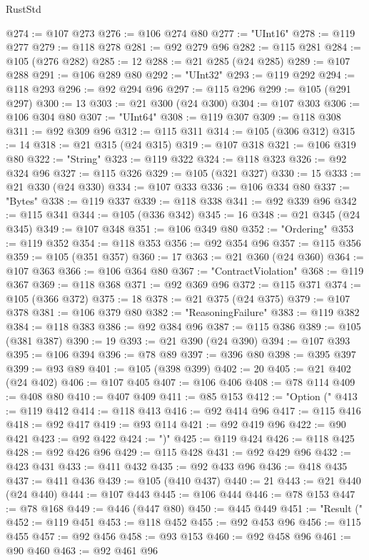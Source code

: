 \begin{lexlean}{RustStd}
\begin{coremodule}
@274 := @107 @273
@276 := @106 @274 @80
@277 := "UInt16"
@278 := @119 @277
@279 := @118 @278
@281 := @92 @279 @96
@282 := @115 @281
@284 := @105 (@276 @282)
@285 := 12
@288 := @21 @285 (@24 @285)
@289 := @107 @288
@291 := @106 @289 @80
@292 := "UInt32"
@293 := @119 @292
@294 := @118 @293
@296 := @92 @294 @96
@297 := @115 @296
@299 := @105 (@291 @297)
@300 := 13
@303 := @21 @300 (@24 @300)
@304 := @107 @303
@306 := @106 @304 @80
@307 := "UInt64"
@308 := @119 @307
@309 := @118 @308
@311 := @92 @309 @96
@312 := @115 @311
@314 := @105 (@306 @312)
@315 := 14
@318 := @21 @315 (@24 @315)
@319 := @107 @318
@321 := @106 @319 @80
@322 := "String"
@323 := @119 @322
@324 := @118 @323
@326 := @92 @324 @96
@327 := @115 @326
@329 := @105 (@321 @327)
@330 := 15
@333 := @21 @330 (@24 @330)
@334 := @107 @333
@336 := @106 @334 @80
@337 := "Bytes"
@338 := @119 @337
@339 := @118 @338
@341 := @92 @339 @96
@342 := @115 @341
@344 := @105 (@336 @342)
@345 := 16
@348 := @21 @345 (@24 @345)
@349 := @107 @348
@351 := @106 @349 @80
@352 := "Ordering"
@353 := @119 @352
@354 := @118 @353
@356 := @92 @354 @96
@357 := @115 @356
@359 := @105 (@351 @357)
@360 := 17
@363 := @21 @360 (@24 @360)
@364 := @107 @363
@366 := @106 @364 @80
@367 := "ContractViolation"
@368 := @119 @367
@369 := @118 @368
@371 := @92 @369 @96
@372 := @115 @371
@374 := @105 (@366 @372)
@375 := 18
@378 := @21 @375 (@24 @375)
@379 := @107 @378
@381 := @106 @379 @80
@382 := "ReasoningFailure"
@383 := @119 @382
@384 := @118 @383
@386 := @92 @384 @96
@387 := @115 @386
@389 := @105 (@381 @387)
@390 := 19
@393 := @21 @390 (@24 @390)
@394 := @107 @393
@395 := @106 @394
@396 := @78 @89
@397 := @396 @80
@398 := @395 @397
@399 := @93 @89
@401 := @105 (@398 @399)
@402 := 20
@405 := @21 @402 (@24 @402)
@406 := @107 @405
@407 := @106 @406
@408 := @78 @114
@409 := @408 @80
@410 := @407 @409
@411 := @85 @153
@412 := "Option ("
@413 := @119 @412
@414 := @118 @413
@416 := @92 @414 @96
@417 := @115 @416
@418 := @92 @417
@419 := @93 @114
@421 := @92 @419 @96
@422 := @90 @421
@423 := @92 @422
@424 := ")"
@425 := @119 @424
@426 := @118 @425
@428 := @92 @426 @96
@429 := @115 @428
@431 := @92 @429 @96
@432 := @423 @431
@433 := @411 @432
@435 := @92 @433 @96
@436 := @418 @435
@437 := @411 @436
@439 := @105 (@410 @437)
@440 := 21
@443 := @21 @440 (@24 @440)
@444 := @107 @443
@445 := @106 @444
@446 := @78 @153
@447 := @78 @168
@449 := @446 (@447 @80)
@450 := @445 @449
@451 := "Result ("
@452 := @119 @451
@453 := @118 @452
@455 := @92 @453 @96
@456 := @115 @455
@457 := @92 @456
@458 := @93 @153
@460 := @92 @458 @96
@461 := @90 @460
@463 := @92 @461 @96

\end{coremodule}
\end{lexlean}
